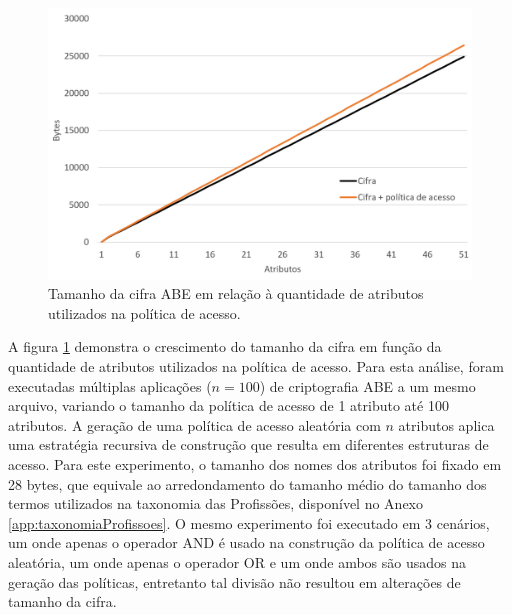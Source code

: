 \documentclass[a4paper,11pt]{article}
\begin{document}
\begin{figure}[!h]
  \centering
  \includegraphics[width=\textwidth]{images/resultados-tamanho-cifra-crescimento.png}
  \caption{Tamanho da cifra ABE em relação à quantidade de atributos utilizados na política de acesso.}
  \label{fig:crescimento-cifra}
\end{figure}

A figura \ref{fig:crescimento-cifra} demonstra o crescimento do tamanho da cifra em função da quantidade de atributos utilizados na política de acesso.
Para esta análise, foram executadas múltiplas aplicações ($n=100$) de criptografia ABE a um mesmo arquivo, variando o tamanho da política de acesso de 1 atributo até 100 atributos.
A geração de uma política de acesso aleatória com $n$ atributos aplica uma estratégia recursiva de construção que resulta em diferentes estruturas de acesso.
Para este experimento, o tamanho dos nomes dos atributos foi fixado em 28 bytes, que equivale ao arredondamento do tamanho médio do tamanho dos termos utilizados na taxonomia das Profissões, disponível no Anexo \ref{app:taxonomiaProfissoes}.
O mesmo experimento foi executado em 3 cenários, um onde apenas o operador AND é usado na construção da política de acesso aleatória, um onde apenas o operador OR e um onde ambos são usados na geração das políticas, entretanto tal divisão não resultou em alterações de tamanho da cifra.
\end{document}
